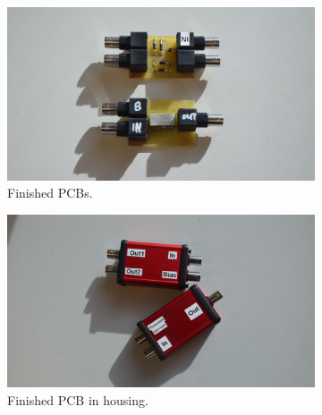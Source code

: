 \begin{figure}[ht]
	\centering
	\begin{subfigure}{0.4\textwidth}
		\centering
		\includegraphics[width=\textwidth]{Chapters/Deflection/PS_CTT_16zu9.JPG}
		\caption{Finished PCBs.}
		\label{fig:ctt_ps}
	\end{subfigure}
	\hspace{0.1\textwidth}
	\begin{subfigure}{0.4\textwidth}
		\centering
		\includegraphics[width=\textwidth]{Chapters/Deflection/PS_CTT1_16zu9.JPG}
		\caption{Finished PCB in housing.}
		\label{fig:ctt_ps_housed}
	\end{subfigure}
	\caption{}
	\label{fig:CTT_housed}
\end{figure}
